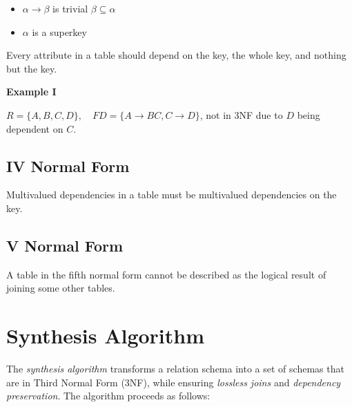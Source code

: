 \begin{itemize}

    \item \(\alpha \to \beta\) is trivial \(\beta \subseteq \alpha\)

    \item \(\alpha\) is a superkey 

\end{itemize}

Every attribute in a table should depend on the key, the whole key, and nothing but the key.
       
\textbf{Example I}

\(R = \{A,B,C,D\}, \quad FD = \{A \to BC, C \to D\}\), not in 3NF due to \(D\) being dependent on \(C\).

\subsection{IV Normal Form} 

Multivalued dependencies in a table must be multivalued dependencies on the key.

\subsection{V Normal Form} 

A table in the fifth normal form cannot be described as the logical result of joining some other tables.

\section{Synthesis Algorithm}

The \emph{synthesis algorithm} transforms a relation schema into a set of schemas that are in Third Normal Form (3NF), 
while ensuring \emph{lossless joins} and \emph{dependency preservation}. The algorithm proceeds as follows:

